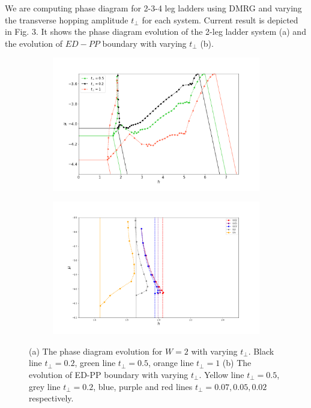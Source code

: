 \documentclass[a0,portrait]{a0poster}
\begin{document}
\begin{multicols}{2}
We are computing phase diagram for 2-3-4 leg ladders using DMRG and varying the transverse hopping amplitude $t_{\perp}$ for each system. %
Current result is depicted in Fig. 3. It shows the phase diagram evolution of the 2-leg ladder system (a) and the evolution of $ED-PP$ boundary with varying $t_{\perp}$ (b). 

\begin{figure}[H]
    \centering
    \begin{subfigure}[t]{0.23\textwidth}
        \centering
        \includegraphics[width=\linewidth]{tperp.png}
        \caption{}
    \end{subfigure}
    \hfill
    \begin{subfigure}[t]{0.23\textwidth}
        \centering
        \includegraphics[width=\linewidth]{comparison_ED-PP_tperp.png}
        \caption{}
     \end{subfigure}
     \caption{(a) The phase diagram evolution for $W = 2$ with varying $t_{\perp}$. Black line $t_{\perp} = 0.2$, green line $t_{\perp} = 0.5$, orange line $t_{\perp} = 1$ (b) The evolution of ED-PP boundary with varying $t_{\perp}$. Yellow line $t_{\perp} = 0.5$, grey line $t_{\perp} = 0.2$, blue, purple and red lines $t_{\perp} = 0.07, 0.05, 0.02$ respectively.}
\end{figure}


\end{multicols}
\end{document}
